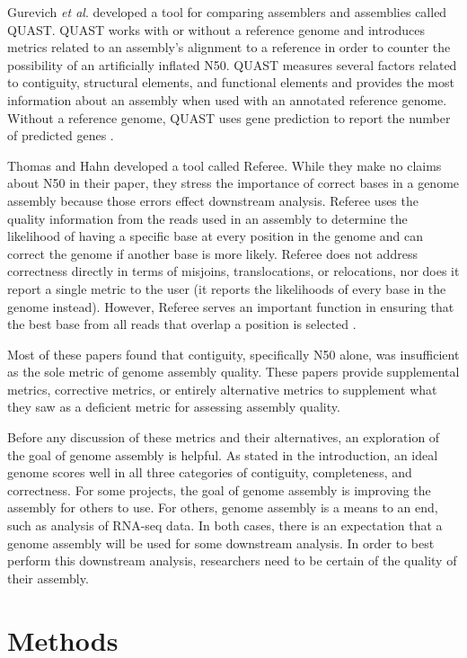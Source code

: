 \documentclass[twocolumn, dvipsnames]{bmcart}%
\begin{document}
Gurevich \textit{et al}. developed a tool for comparing assemblers and assemblies called QUAST. QUAST works with or without a reference genome and introduces metrics related to an assembly's alignment to a reference in order to counter the possibility of an artificially inflated N50. QUAST measures several factors related to contiguity, structural elements, and functional elements and provides the most information about an assembly when used with an annotated reference genome. Without a reference genome, QUAST uses gene prediction to report the number of predicted genes \cite{Gurevich2013}.

Thomas and Hahn developed a tool called Referee. While they make no claims about N50 in their paper, they stress the importance of correct bases in a genome assembly because those errors effect downstream analysis. Referee uses the quality information from the reads used in an assembly to determine the likelihood of having a specific base at every position in the genome and can correct the genome if another base is more likely. Referee does not address correctness directly in terms of misjoins, translocations, or relocations, nor does it report a single metric to the user (it reports the likelihoods of every base in the genome instead). However, Referee serves an important function in ensuring that the best base from all reads that overlap a position is selected \cite{thomas_referee:_2019}.

Most of these papers found that contiguity, specifically N50 alone, was insufficient as the sole metric of genome assembly quality. These papers provide supplemental metrics, corrective metrics, or entirely alternative metrics to supplement what they saw as a deficient metric for assessing assembly quality.

Before any discussion of these metrics and their alternatives, an exploration of the goal of genome assembly is helpful. As stated in the introduction, an ideal genome scores well in all three categories of contiguity, completeness, and correctness. For some projects, the goal of genome assembly is improving the assembly for others to use. For others, genome assembly is a means to an end, such as analysis of RNA-seq data. In both cases, there is an expectation that a genome assembly will be used for some downstream analysis. In order to best perform this downstream analysis, researchers need to be certain of the quality of their assembly.

\section*{Methods}
\end{document}
